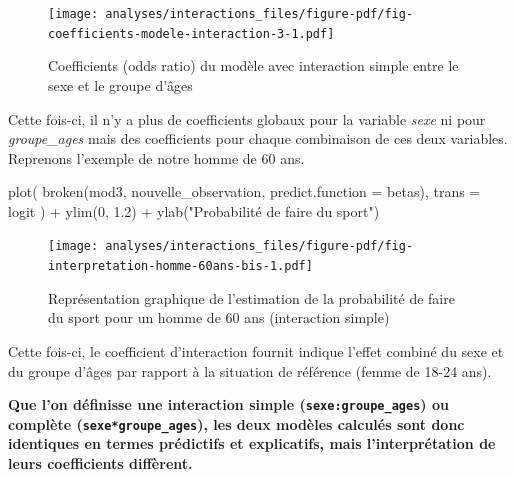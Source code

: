 \documentclass[
  letterpaper,
  DIV=11,
  numbers=noendperiod,
  oneside]{scrreprt}
\newenvironment{Shaded}{\begin{snugshade}}{\end{snugshade}}
\newcommand{\AttributeTok}[1]{\textcolor[rgb]{0.40,0.45,0.13}{#1}}
\newcommand{\DecValTok}[1]{\textcolor[rgb]{0.68,0.00,0.00}{#1}}
\newcommand{\FloatTok}[1]{\textcolor[rgb]{0.68,0.00,0.00}{#1}}
\newcommand{\FunctionTok}[1]{\textcolor[rgb]{0.28,0.35,0.67}{#1}}
\newcommand{\NormalTok}[1]{\textcolor[rgb]{0.00,0.23,0.31}{#1}}
\newcommand{\SpecialCharTok}[1]{\textcolor[rgb]{0.37,0.37,0.37}{#1}}
\newcommand{\StringTok}[1]{\textcolor[rgb]{0.13,0.47,0.30}{#1}}
\begin{document}
\begin{figure}[H]

{\centering \texttt{[image: analyses/interactions\_files/figure-pdf/fig-coefficients-modele-interaction-3-1.pdf]}

}

\caption{\label{fig-coefficients-modele-interaction-3}Coefficients (odds
ratio) du modèle avec interaction simple entre le sexe et le groupe
d'âges}

\end{figure}

Cette fois-ci, il n'y a plus de coefficients globaux pour la variable
\emph{sexe} ni pour \emph{groupe\_ages} mais des coefficients pour
chaque combinaison de ces deux variables. Reprenons l'exemple de notre
homme de 60 ans.

\begin{Shaded}
\begin{Highlighting}[]
\FunctionTok{plot}\NormalTok{(}
  \FunctionTok{broken}\NormalTok{(mod3, nouvelle\_observation, }\AttributeTok{predict.function =}\NormalTok{ betas),}
  \AttributeTok{trans =}\NormalTok{ logit}
\NormalTok{) }\SpecialCharTok{+}
  \FunctionTok{ylim}\NormalTok{(}\DecValTok{0}\NormalTok{, }\FloatTok{1.2}\NormalTok{) }\SpecialCharTok{+}
  \FunctionTok{ylab}\NormalTok{(}\StringTok{"Probabilité de faire du sport"}\NormalTok{)}
\end{Highlighting}
\end{Shaded}

\begin{figure}[H]

{\centering \texttt{[image: analyses/interactions\_files/figure-pdf/fig-interpretation-homme-60ans-bis-1.pdf]}

}

\caption{\label{fig-interpretation-homme-60ans-bis}Représentation
graphique de l'estimation de la probabilité de faire du sport pour un
homme de 60 ans (interaction simple)}

\end{figure}

Cette fois-ci, le coefficient d'interaction fournit indique l'effet
combiné du sexe et du groupe d'âges par rapport à la situation de
référence (femme de 18-24 ans).

\textbf{Que l'on définisse une interaction simple
(\texttt{sexe:groupe\_ages}) ou complète (\texttt{sexe*groupe\_ages}),
les deux modèles calculés sont donc identiques en termes prédictifs et
explicatifs, mais l'interprétation de leurs coefficients diffèrent.}
\end{document}
